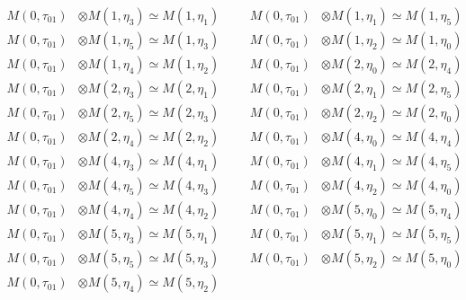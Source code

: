\begin{align*}
M(0,\tau_{01}) &\otimes M(1,\eta_{3}) \simeq M(1,\eta_{1}) &&& M(0,\tau_{01}) &\otimes M(1,\eta_{1}) \simeq M(1,\eta_{5})\\
M(0,\tau_{01}) &\otimes M(1,\eta_{5}) \simeq M(1,\eta_{3}) &&& M(0,\tau_{01}) &\otimes M(1,\eta_{2}) \simeq M(1,\eta_{0})\\
M(0,\tau_{01}) &\otimes M(1,\eta_{4}) \simeq M(1,\eta_{2}) &&& M(0,\tau_{01}) &\otimes M(2,\eta_{0}) \simeq M(2,\eta_{4})\\
M(0,\tau_{01}) &\otimes M(2,\eta_{3}) \simeq M(2,\eta_{1}) &&& M(0,\tau_{01}) &\otimes M(2,\eta_{1}) \simeq M(2,\eta_{5})\\
M(0,\tau_{01}) &\otimes M(2,\eta_{5}) \simeq M(2,\eta_{3}) &&& M(0,\tau_{01}) &\otimes M(2,\eta_{2}) \simeq M(2,\eta_{0})\\
M(0,\tau_{01}) &\otimes M(2,\eta_{4}) \simeq M(2,\eta_{2}) &&& M(0,\tau_{01}) &\otimes M(4,\eta_{0}) \simeq M(4,\eta_{4})\\
M(0,\tau_{01}) &\otimes M(4,\eta_{3}) \simeq M(4,\eta_{1}) &&& M(0,\tau_{01}) &\otimes M(4,\eta_{1}) \simeq M(4,\eta_{5})\\
M(0,\tau_{01}) &\otimes M(4,\eta_{5}) \simeq M(4,\eta_{3}) &&& M(0,\tau_{01}) &\otimes M(4,\eta_{2}) \simeq M(4,\eta_{0})\\
M(0,\tau_{01}) &\otimes M(4,\eta_{4}) \simeq M(4,\eta_{2}) &&& M(0,\tau_{01}) &\otimes M(5,\eta_{0}) \simeq M(5,\eta_{4})\\
M(0,\tau_{01}) &\otimes M(5,\eta_{3}) \simeq M(5,\eta_{1}) &&& M(0,\tau_{01}) &\otimes M(5,\eta_{1}) \simeq M(5,\eta_{5})\\
M(0,\tau_{01}) &\otimes M(5,\eta_{5}) \simeq M(5,\eta_{3}) &&& M(0,\tau_{01}) &\otimes M(5,\eta_{2}) \simeq M(5,\eta_{0})\\
M(0,\tau_{01}) &\otimes M(5,\eta_{4}) \simeq M(5,\eta_{2})
\end{align*}

